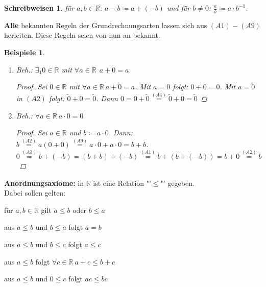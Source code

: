 \documentclass[12pt]{extreport} %
\newcommand{\R}{\mathbb{R}}
\theoremstyle{named}
\theoremstyle{dotless}
\newtheorem*{beispiele}{Beispiele}
\newtheorem*{schreibweisen}{Schreibweisen}
\begin{document}
\begin{schreibweisen}
	für $a, b \in \R$: $a - b \coloneqq a + (-b)$ und für $b \neq 0$: $ \frac{a}{b} \coloneqq a \cdot b^{-1}$.
\end{schreibweisen}


\textbf{Alle} bekannten Regeln der Grundrechnungsarten lassen sich aus $(A1) - (A9)$ herleiten. Diese Regeln seien von nun an bekannt.


\begin{beispiele} ~\
	\begin{enumerate}
		\item Beh.: $\exists_{1} 0 \in  \R$ mit $\forall a \in \R \: \ a + 0 = a$
		  \begin{proof}
			Sei $\tilde{0} \in \R$ mit $\forall a \in \R \: a + \tilde{0} = a$. Mit $a = 0$ folgt: $0 + \tilde{0} = 0$. Mit $a = \tilde{0}$ in $(A2)$ folgt: $\tilde{0} + 0 = \tilde{0}$. Dann $0 = 0 + \tilde{0} \overset{(A4)}{=} \tilde{0} + 0 = \tilde{0}$
		  \end{proof}
		 \item Beh.: $\forall a \in \R \: a \cdot 0 = 0$
		   \begin{proof}
		     Sei $a \in \R$ und $b \coloneqq a \cdot 0$. Dann: $b \overset{(A2)}{=} a (0 + 0) \overset{(A9)}{=} a \cdot 0 + a \cdot 0 = b + b$. \\
		     $0 \overset{(A3)}{=} b + (-b) = (b + b) + (-b) \overset{(A1)}{=} b + (b + (-b)) = b + 0 \overset{(A2)}{=} b$
		   \end{proof}
	\end{enumerate}
\end{beispiele}

\textbf{Anordnungsaxiome:} in $\R$ ist eine Relation "'$\leq$"' gegeben. \\
Dabei sollen gelten:
\begin{description} \addtolength{\itemindent}{0.4cm}
	\item[$(A10)$] für $a, b \in \R$ gilt $a \leq b$ oder $b \leq a$ \label{a.axiom-a10}
	\item[$(A11)$] aus $a \leq b$ und $b \leq a$ folgt $a = b$ \label{a.axiom-a11}
	\item[$(A12)$] aus $a \leq b$ und $b \leq c$ folgt $a \leq c$ \label{a.axiom-a12}
	\item[$(A13)$] aus $a \leq b$ folgt $\forall c \in \R \: a + c \leq b + c$ \label{a.axiom-a13}
	\item[$(A14)$] aus $a \leq b$ und $0 \leq c$ folgt $ac \leq b c$ \label{a.axiom-a14}
\end{description}
\end{document}
